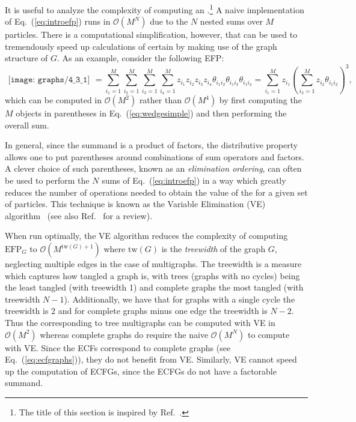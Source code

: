 \documentclass[letterpaper,11pt]{article}
\DeclareRobustCommand{\Eq}[1]{Eq.~(\ref{#1})}
\DeclareRobustCommand{\Ref}[1]{Ref.~\cite{#1}}
\newcommand{\B}{\text{EFP}\xspace}
\newcommand{\Bs}{\text{EFPs}\xspace}
\begin{document}
\afterpage{\clearpage}

It is useful to analyze the complexity of computing an \B.\footnote{The title of this section is inspired by \Ref{Cacciari:2005hq}.}
%
A naive implementation of \Eq{eq:introefp} runs in $\mathcal O(M^N)$ due to the $N$ nested sums over $M$ particles.
%
There is a computational simplification, however, that can be used to tremendously speed up calculations of certain \Bs by making use of the graph structure of $G$.
%
As an example, consider the following EFP:
\begin{equation}\label{eq:wedgesimple}
\begin{gathered}
\texttt{[image: graphs/4\_3\_1]}
\end{gathered}
=\sum_{i_1=1}^M \sum_{i_2=1}^M \sum_{i_3=1}^M\sum_{i_4=1}^M z_{i_1}z_{i_2}z_{i_3}z_{i_4}\theta_{i_1i_2}\theta_{i_1i_3}\theta_{i_1i_4} = \sum_{i_1=1}^M z_{i_1} \left(\sum_{i_2=1}^M z_{i_2}\theta_{i_1i_2}\right)^3,
\end{equation}
which can be computed in $\mathcal O(M^2)$ rather than $\mathcal O(M^4)$ by first computing the $M$ objects in parentheses in \Eq{eq:wedgesimple} and then performing the overall sum.

In general, since the summand is a product of factors, the distributive property allows one to put parentheses around combinations of sum operators and factors. 
%
A clever choice of such parentheses, known as an \emph{elimination ordering}, can often be used to perform the $N$ sums of \Eq{eq:introefp} in a way which greatly reduces the number of operations needed to obtain the value of the \B for a given set of particles. 
%
This technique is known as the Variable Elimination (VE) algorithm~\cite{zhang1996exploiting} (see also \Ref{murphy2012machine} for a review). 

When run optimally, the VE algorithm reduces the complexity of computing $\B_G$ to $\mathcal{O}(M^{\text{tw}(G)+1})$ where $\text{tw}(G)$ is the \emph{treewidth} of the graph $G$, neglecting multiple edges in the case of multigraphs.
%
The treewidth is a measure which captures how tangled a graph is, with trees (graphs with no cycles) being the least tangled (with treewidth 1) and complete graphs the most tangled (with treewidth $N-1$). 
%
Additionally, we have that for graphs with a single cycle the treewidth is 2 and for complete graphs minus one edge the treewidth is $N-2$. 
%
Thus the \Bs corresponding to tree multigraphs can be computed with VE in $\mathcal O(M^2)$ whereas complete graphs do require the naive $\mathcal O(M^N)$ to compute with VE. 
%
Since the ECFs correspond to complete graphs (see \Eq{eq:ecfgraphs}), they do not benefit from VE.  Similarly, VE cannot speed up the computation of ECFGs, since the ECFGs do not have a factorable summand.
\end{document}
